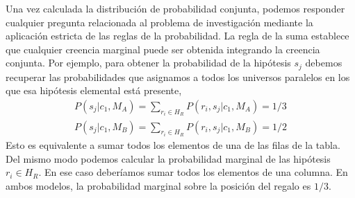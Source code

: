 \documentclass[a4paper,11pt]{book}
\theoremstyle{definition}
\begin{document}
Una vez calculada la distribuci\'on de probabilidad conjunta, podemos responder cualquier pregunta relacionada al problema de investigaci\'on mediante la aplicaci\'on estricta de las reglas de la probabilidad.
%
La regla de la suma establece que cualquier creencia marginal puede ser obtenida integrando la creencia conjunta.
%
Por ejemplo, para obtener la probabilidad de la hip\'otesis $s_j$ debemos recuperar las probabilidades que asignamos a todos los universos paralelos en los que esa hip\'otesis elemental est\'a presente,
%
\begin{equation} \label{eq:creencia_marginal}
\begin{split}
P(s_j|c_1,M_A) = \sum_{r_i \in H_R} P(r_i, s_j|c_1, M_A) = 1/3 \\
P(s_j|c_1,M_B) = \sum_{r_i \in H_R} P(r_i, s_j|c_1, M_B) = 1/2
\end{split}
\end{equation}
%
Esto es equivalente a sumar todos los elementos de una de las filas de la tabla.
%
Del mismo modo podemos calcular la probabilidad marginal de las hip\'otesis $r_i \in H_R$.
%
En ese caso deber\'iamos sumar todos los elementos de una columna.
%
En ambos modelos, la probabilidad marginal sobre la posici\'on del regalo es $1/3$.

\end{document}
